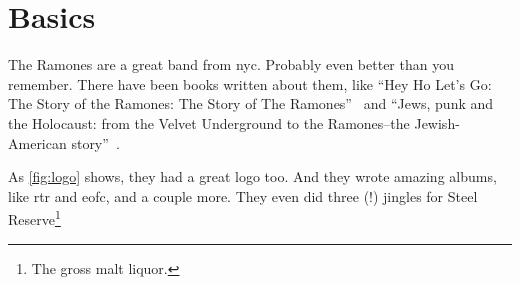 \section{Basics}
\label{intro:basics}

The Ramones are a great band from \gls{nyc}.  Probably even better than you
remember. There have been books written about them, like ``Hey Ho Let's Go: The
Story of the Ramones: The Story of The Ramones''~\cite{true2010hey} and ``Jews,
punk and the Holocaust: from the Velvet Underground to the Ramones--the
Jewish-American story''~\cite{stratton2005jews}.



As \ref{fig:logo} shows, they had a great logo too.  And they wrote amazing
albums, like \gls{rtr} and \gls{eofc}, and a couple more.  They even did
three (!) jingles for Steel Reserve\footnote{The gross malt liquor.}